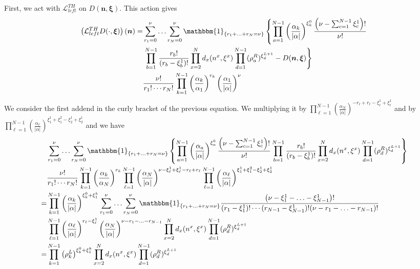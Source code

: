 \documentclass[10pt]{article}
\numberwithin{equation}{section}
\numberwithin{equation}{subsection}
\begin{document}
First, we act with $\mathcal{L}_{left}^{TH}$ on $D(\bm{n},\bm{\xi})$. This action gives
\begin{align}\label{ProvaBordoTH}
	\left(\mathcal{L}_{left}^{TH}D(\cdot,\bm{\xi})\right)(\bm{n})=\nonumber&\sum_{r_{1}=0}^{\nu}\ldots\sum_{r_{N}=0}^{\nu}\mathbbm{1}_{\{r_{1}+\ldots+r_{N}=\nu\}}\left\{\prod_{a=1}^{N-1}\left(\frac{\alpha_{k}}{|\alpha|}\right)^{\xi_{k}^{0}}\frac{\left(\nu-\sum_{c=1}^{N-1}\xi_{c}^{1}\right)!}{\nu!}\right.
	\\&\nonumber
	\left.\prod_{b=1}^{N-1}\frac{r_{b}!}{(r_{b}-\xi^{1}_{b})!}\prod_{x=2}^{N}d_{x}(n^{x},\xi^{x})\prod_{d=1}^{N-1}(\rho_{a}^{R})^{\xi_{d}^{L+1}}-D(\bm{n},\bm{\xi})\right\}
	\\&
	\frac{\nu!}{r_{1}!\cdots r_{N}!}\prod_{k=1}^{N-1}\left(\frac{\alpha_{k}}{\alpha_{1}}\right)^{r_{k}}\left(\frac{\alpha_{1}}{|\alpha|}\right)^{\nu}
\end{align}
We consider the first addend in the curly bracket of the previous equation. We multiplying it by $\prod_{\ell=1}^{N-1}\left(\frac{\alpha_{N}}{|\alpha|}\right)^{-r_{\ell}+r_{\ell}-\xi_{\ell}^{1}+\xi_{\ell}^{1}}$ and by $\prod_{\ell=1}^{N-1}\left(\frac{\alpha_{\ell}}{|\alpha|}\right)^{\xi_{1}^{1}+\xi_{1}^{2}-\xi_{2}^{1}+\xi_{2}^{1}}$ and we have
\begin{align}\label{pezzo1}
	&\sum_{r_{1}=0}^{\nu}\ldots\sum_{r_{N}=0}^{\nu}\mathbbm{1}_{\{r_{1}+\ldots+r_{N}=\nu\}}\left\{\prod_{a=1}^{N-1}\left(\frac{\alpha_{a}}{|\alpha|}\right)^{\xi_{a}^{0}}\frac{\left(\nu-\sum_{c=1}^{N-1}\xi_{c}^{1}\right)!}{\nu!}\prod_{b=1}^{N-1}\frac{r_{b}!}{(r_{b}-\xi^{1}_{b})!}\prod_{x=2}^{N}d_{x}(n^{x},\xi^{x})\prod_{d=1}^{N-1}(\rho_{d}^{R})^{\xi_{d}^{L+1}}\right\}\nonumber\\&	\frac{\nu!}{r_{1}!\cdots r_{N}!}\prod_{k=1}^{N-1}\left(\frac{\alpha_{k}}{\alpha_{N}}\right)^{r_{k}}\prod_{\ell=1}^{N-1}\left(\frac{\alpha_{N}}{|\alpha|}\right)^{\nu-\xi_{\ell}^{1}+\xi_{\ell}^{1}-r_{\ell}+r_{\ell}}\prod_{\ell=1}^{N-1}\left(\frac{\alpha_{\ell}}{|\alpha|}\right)^{\xi_{1}^{1}+\xi_{1}^{2}-\xi_{2}^{1}+\xi_{2}^{1}}\nonumber\\=&
	\prod_{k=1}^{N-1}\left(\frac{\alpha_{k}}{|\alpha|}\right)^{\xi_{k}^{0}+\xi_{1}^{k}}\sum_{r_{1}=0}^{\nu}\ldots\sum_{r_{N}=0}^{\nu}\mathbbm{1}_{\{r_{1}+\ldots+r_{N}=\nu\}}	\frac{\left(\nu-\xi_{1}^{1}-\ldots-\xi_{N-1}^{1}\right)!}{(r_{1}-\xi_{1}^{1})!\cdots(r_{N-1}-\xi_{N-1}^{1})!(\nu-r_{1}-\ldots-r_{N-1})!}\nonumber\\&
	\prod_{\ell=1}^{N-1}\left(\frac{\alpha_{\ell}}{|\alpha|}\right)^{r_{\ell}-\xi_{\ell}^{1}}\left(\frac{\alpha_{N}}{|\alpha|}\right)^{\nu-r_{1}-\ldots-r_{N-1}}\prod_{x=2}^{N}d_{x}(n^{x},\xi^{x})\prod_{d=1}^{N-1}(\rho_{d}^{R})^{\xi_{d}^{L+1}}\nonumber
	\\=&
	\prod_{k=1}^{N-1}\left(\rho_{k}^{L}\right)^{\xi_{k}^{0}+\xi_{1}^{k}}\prod_{x=2}^{N}d_{x}(n^{x},\xi^{x})\prod_{d=1}^{N-1}(\rho_{d}^{R})^{\xi_{d}^{L+1}}
\end{align}
\end{document}
